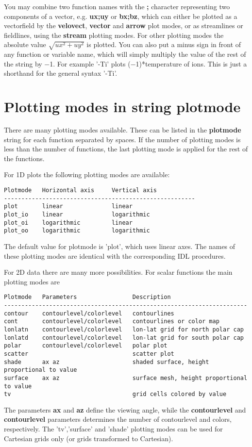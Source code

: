\documentclass{article}
\begin{document}
You may combine two function names with the {\bf ;} character representing
two components of a vector, 
e.g. {\bf ux;uy} or {\bf bx;bz}, which can either be plotted as a 
vectorfield by the {\bf velovect}, {\bf vector} and {\bf arrow} plot modes, 
or as streamlines or fieldlines, using the {\bf stream} plotting modes.
For other plotting modes the absolute value
$\sqrt{ux^2+uy^2}$ is plotted.
You can also put a minus sign in front of any function or variable
name, which will simply multiply the value of the rest of the string by $-$1. 
For example '-Ti' plots ($-$1)*temperature of ions. This is just a shorthand for
the general syntax '-{Ti}'.

\section{Plotting modes in string plotmode \label{s-plotmode}}

There are many plotting modes available. 
These can be listed in the {\bf plotmode} string for each function separated 
by spaces. If the number of plotting modes is less than the number of functions,
the last plotting mode is applied for the rest of the functions.

For 1D plots the following plotting modes are available: 
\begin{verbatim}
Plotmode   Horizontal axis     Vertical axis
-------------------------------------------------------
plot       linear              linear
plot_io    linear              logarithmic
plot_oi    logarithmic         linear
plot_oo    logarithmic         logarithmic
\end{verbatim}
The default value for plotmode is 'plot', which uses linear axes.
The names of these plotting modes are identical with the corresponding IDL
procedures.

For 2D data there are many more possibilities.
For scalar functions the main plotting modes are 
\begin{verbatim}
Plotmode   Parameters                Description
----------------------------------------------------------------------
contour    contourlevel/colorlevel   contourlines
cont       contourlevel/colorlevel   contourlines or color map
lonlatn    contourlevel/colorlevel   lon-lat grid for north polar cap
lonlatd    contourlevel/colorlevel   lon-lat grid for south polar cap
polar      contourlevel/colorlevel   polar plot
scatter                              scatter plot
shade      ax az                     shaded surface, height proportional to value
surface    ax az                     surface mesh, height proportional to value
tv                                   grid cells colored by value
\end{verbatim}
The parameters {\bf ax} and {\bf az} define the viewing angle,
while the {\bf contourlevel} and {\bf contourlevel} parameters
determines the number of contourlevel and colors, respectively.
The 'tv','surface' and 'shade' plotting modes
can be used for Cartesian grids only (or grids transformed to Cartesian).
\end{document}
